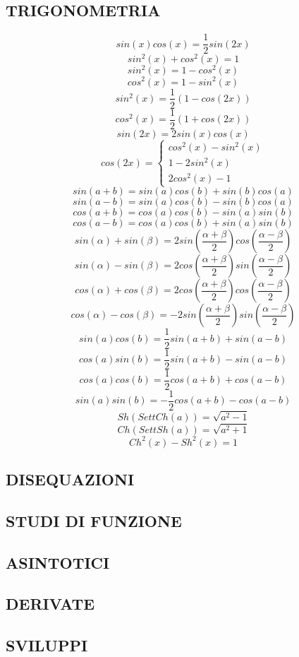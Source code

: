 \documentclass[a4paper, 9pt]{report}
\begin{document}
\subsection*{TRIGONOMETRIA}
\[
    sin(x) cos(x) = \frac{1}{2}sin(2x)
\]
\[
    sin^2(x) + cos^2(x) = 1
\]
\[
    sin^2(x) = 1- cos^2(x)
\]
\[
    cos^2(x) = 1- sin^2(x)
\]
\[
    sin^2(x) = \frac{1}{2} (1-cos(2x))
\]
\[
    cos^2(x) = \frac{1}{2}(1+cos(2x))
\]
\[
    sin(2x) = 2sin (x)cos(x)
\]
\[
    cos(2x) = \begin{cases}
        cos^2(x) -sin^2(x)\\
        1-2sin^2(x)\\
        2cos^2(x)-1
    \end{cases}
\]
\[
    sin(a+b) =sin(a)cos(b) + sin(b) cos(a)
\]
\[
    sin(a-b) = sin(a)cos(b) - sin(b)cos(a)
\]
\[
    cos(a+b) = cos(a)cos(b) - sin(a)sin(b)
\]
\[
    cos(a-b)=cos(a)cos(b) + sin(a)sin(b)
\]
\[
    sin(\alpha) + sin(\beta) = 2 sin\left(\frac{\alpha + \beta}{2}\right) cos \left(\frac{\alpha - \beta}{2}\right)
\]
\[
    sin(\alpha) - sin(\beta) = 2 cos\left(\frac{\alpha + \beta}{2}\right) sin\left(\frac{\alpha - \beta}{2}\right)
\]
\[
    cos(\alpha) + cos(\beta) = 2 cos\left(\frac{\alpha + \beta}{2}\right) cos\left(\frac{\alpha - \beta}{2}\right)
\]
\[
    cos(\alpha) - cos(\beta) = -2sin\left(\frac{\alpha + \beta}{2}\right) sin\left(\frac{\alpha - \beta}{2}\right)
\]
\[
    sin(a)cos(b)=\frac{1}{2}sin(a+b)+sin(a-b)
\]
\[
    cos(a)sin(b)=\frac{1}{2}sin(a+b)-sin(a-b)
\]
\[
    cos(a)cos(b)=\frac{1}{2}cos(a+b)+cos(a-b)
\]
\[
    sin(a)sin(b)=-\frac{1}{2}cos(a+b)- cos(a-b)
\]
\[
    Sh(SettCh(a))= \sqrt{a^2-1}
\]
\[
    Ch(SettSh(a))=\sqrt{a^2+1}
\]
\[
    Ch^2(x) - Sh^2(x) = 1
\]
\subsection*{DISEQUAZIONI}
\subsection*{STUDI DI FUNZIONE}
\subsection*{ASINTOTICI}
\subsection*{DERIVATE}
\subsection*{SVILUPPI}
\end{document}
